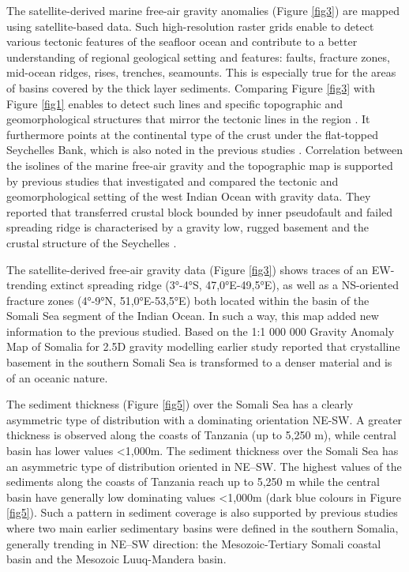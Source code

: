 \documentclass[]{interact}
\begin{document}
The satellite-derived marine free-air gravity anomalies (Figure \ref{fig3}) are mapped using satellite-based data. Such high-resolution raster grids enable to detect various tectonic features of the seafloor ocean and contribute to a better understanding of regional geological setting and features: faults, fracture zones, mid-ocean ridges, rises, trenches, seamounts. This is especially true for the areas of basins covered by the thick layer sediments. Comparing Figure \ref{fig3} with Figure \ref{fig1} enables to detect such lines and specific topographic and geomorphological structures that mirror the tectonic lines in the region \cite{Bird}. It furthermore points at the continental type of the crust under the flat-topped Seychelles Bank, which is also noted in the previous studies \cite{MatthewsDavies}. Correlation between the isolines of the marine free-air gravity and the topographic map is supported by previous studies that investigated and compared the tectonic and geomorphological setting of the west Indian Ocean with gravity data. They reported that transferred crustal block bounded by inner pseudofault and failed spreading ridge is characterised by a gravity low, rugged basement and the crustal structure of the Seychelles \cite{Sreejith,DaviesFrancis}.

The satellite-derived free-air gravity data (Figure \ref{fig3}) shows traces of an EW-trending extinct spreading ridge (3°-4°S, 47,0°E-49,5°E), as well as a NS-oriented fracture zones (4°-9°N, 51,0°E-53,5°E) both located within the basin of the Somali Sea segment of the Indian Ocean. In such a way, this map added new information to the previous studied. Based on the 1:1 000 000 Gravity Anomaly Map of Somalia for 2.5D gravity modelling earlier study \cite{Rapollaetal1995} reported that crystalline basement in the southern Somali Sea is transformed to a denser material and is of an oceanic nature.

The sediment thickness (Figure \ref{fig5}) over the Somali Sea has a clearly asymmetric type of distribution with a dominating orientation NE-SW. A greater thickness is observed along the coasts of Tanzania (up to 5,250 m), while central basin has lower values <1,000m. The sediment thickness over the Somali Sea has an asymmetric type of distribution oriented in NE–SW. The highest values of the sediments along the coasts of Tanzania reach up to 5,250 m while the central basin have generally low dominating values <1,000m (dark blue colours in Figure \ref{fig5}). Such a pattern in sediment coverage is also supported by previous studies \cite{AliKassim} where two main earlier sedimentary basins were defined in the southern Somalia, generally trending in NE–SW direction: the Mesozoic-Tertiary Somali coastal basin and the Mesozoic Luuq-Mandera basin. 
\end{document}
